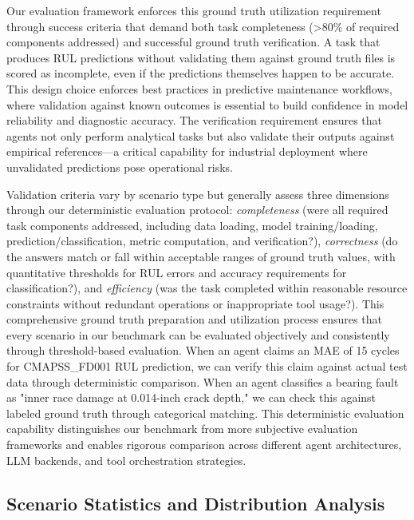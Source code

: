 \documentclass[sigconf]{acmart}
\begin{document}
Our evaluation framework enforces this ground truth utilization requirement through success criteria that demand both task completeness (\textgreater80\% of required components addressed) and successful ground truth verification. A task that produces RUL predictions without validating them against ground truth files is scored as incomplete, even if the predictions themselves happen to be accurate. This design choice enforces best practices in predictive maintenance workflows, where validation against known outcomes is essential to build confidence in model reliability and diagnostic accuracy. The verification requirement ensures that agents not only perform analytical tasks but also validate their outputs against empirical references---a critical capability for industrial deployment where unvalidated predictions pose operational risks.

Validation criteria vary by scenario type but generally assess three dimensions through our deterministic evaluation protocol: \textit{completeness} (were all required task components addressed, including data loading, model training/loading, prediction/classification, metric computation, and verification?), \textit{correctness} (do the answers match or fall within acceptable ranges of ground truth values, with quantitative thresholds for RUL errors and accuracy requirements for classification?), and \textit{efficiency} (was the task completed within reasonable resource constraints without redundant operations or inappropriate tool usage?). This comprehensive ground truth preparation and utilization process ensures that every scenario in our benchmark can be evaluated objectively and consistently through threshold-based evaluation. When an agent claims an MAE of 15 cycles for CMAPSS\_FD001 RUL prediction, we can verify this claim against actual test data through deterministic comparison. When an agent classifies a bearing fault as "inner race damage at 0.014-inch crack depth," we can check this against labeled ground truth through categorical matching. This deterministic evaluation capability distinguishes our benchmark from more subjective evaluation frameworks and enables rigorous comparison across different agent architectures, LLM backends, and tool orchestration strategies.

\subsection{Scenario Statistics and Distribution Analysis}
\label{subsec:statistics}
\end{document}
